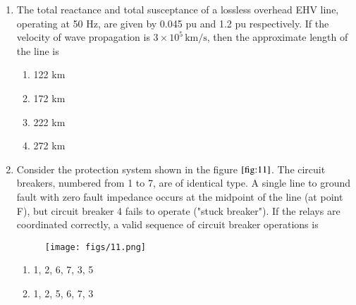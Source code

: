 \documentclass[journal]{IEEEtran}
\numberwithin{equation}{enumi}
\numberwithin{figure}{enumi}
\begin{document}
\begin{enumerate}
   \begin{figure}[!ht]
    \centering
    \texttt{[image: figs/9.png]}
    \caption{}
    \label{fig:9}
   \end{figure}
   \begin{multicols}{2}
   \begin{enumerate}
        \item Make $\delta$ positive and maintain it at a positive value
        \item Make $\delta$ positive and return it to its original value
        \item Make $\delta$ negative and maintain it at a negative value
        \item Make $\delta$ negative and return it to its original value
    \end{enumerate}
    \end{multicols}
    \bigskip
    \item The total reactance and total susceptance of a lossless overhead EHV line, operating at 50 Hz, are given by 0.045 pu and 1.2 pu respectively. If the velocity of wave propagation is $3 \times 10^5 \, \text{km/s}$, then the approximate length of the line is
    \begin{multicols}{4}
    \begin{enumerate}
        \item 122 km
        \item 172 km
        \item 222 km
        \item 272 km
    \end{enumerate}
    \end{multicols}
    \bigskip
    \item  Consider the protection system shown in the figure $\ref{fig:11}$. The circuit breakers, numbered from 1 to 7, are of identical type. A single line to ground fault with zero fault impedance occurs at the midpoint of the line (at point F), but circuit breaker 4 fails to operate ("stuck breaker"). If the relays are coordinated correctly, a valid sequence of circuit breaker operations is
    \begin{figure}[!ht]
    \centering
    \texttt{[image: figs/11.png]}
    \caption{}
    \label{fig:11}
    \end{figure}
    \begin{multicols}{4}
    \begin{enumerate}
        \item 1, 2, 6, 7, 3, 5
        \item 1, 2, 5, 6, 7, 3

\end{enumerate}
\end{multicols}
\end{enumerate}
\end{document}
